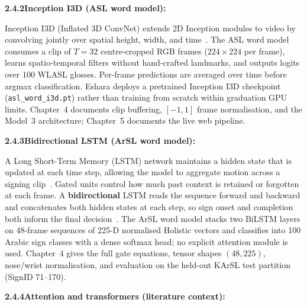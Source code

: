 \noindent\textbf{2.4.2\quad Inception I3D (ASL word model):}\par
{}
\vspace{0.3cm}

\noindent Inception I3D (Inflated 3D ConvNet) extends 2D Inception modules to video by convolving jointly over spatial height, width, and time~\cite{li2020wlasl}. The ASL word model consumes a clip of $T{=}32$ centre-cropped RGB frames ($224 \times 224$ per frame), learns spatio-temporal filters without hand-crafted landmarks, and outputs logits over 100 WLASL glosses. Per-frame predictions are averaged over time before argmax classification. Eshara deploys a pretrained Inception I3D checkpoint (\texttt{asl\_word\_i3d.pt}) rather than training from scratch within graduation GPU limits. Chapter~4 documents clip buffering, $[-1,1]$ frame normalisation, and the Model~3 architecture; Chapter~5 documents the live web pipeline.\par\vspace{0.2cm}

\noindent\textbf{2.4.3\quad Bidirectional LSTM (ArSL word model):}\par
{}
\vspace{0.3cm}

\noindent A Long Short-Term Memory (LSTM) network maintains a hidden state that is updated at each time step, allowing the model to aggregate motion across a signing clip~\cite{hochreiter1997long,pascanu2013difficulty}. Gated units control how much past context is retained or forgotten at each frame. A \textbf{bidirectional} LSTM reads the sequence forward and backward and concatenates both hidden states at each step, so sign onset and completion both inform the final decision~\cite{schuster1997bidirectional,pigou2018sign}. The ArSL word model stacks two BiLSTM layers on 48-frame sequences of 225-D normalised Holistic vectors and classifies into 100 Arabic sign classes with a dense softmax head; no explicit attention module is used. Chapter~4 gives the full gate equations, tensor shapes $(48, 225)$, nose/wrist normalisation, and evaluation on the held-out KArSL test partition (SignID 71--170).\par\vspace{0.2cm}

\noindent\textbf{2.4.4\quad Attention and transformers (literature context):}\par
{}
\vspace{0.3cm}

